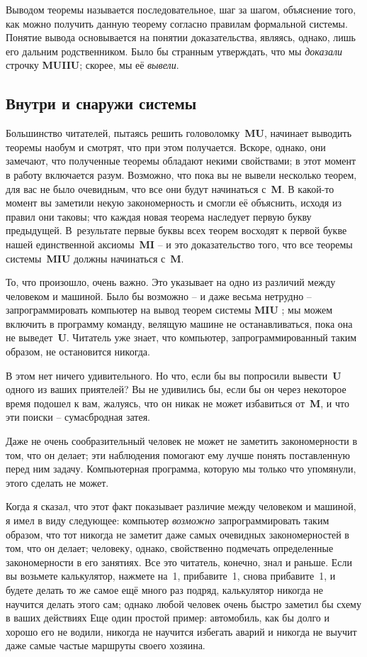 \documentclass[../main.tex]{subfiles}
\begin{document}
Выводом теоремы называется последовательное, шаг за шагом, объяснение того, как можно получить данную теорему согласно правилам формальной системы. Понятие вывода основывается на понятии доказательства, являясь, однако, лишь его дальним родственником. Было бы странным утверждать, что мы \emph{доказали} строчку \textbf{MUIIU}; скорее, мы её \emph{вывели}.


\subsection{Внутри и снаружи системы}

Большинство читателей, пытаясь решить головоломку~\textbf{MU}, начинает выводить теоремы наобум и смотрят, что при этом получается. Вскоре, однако, они замечают, что полученные теоремы обладают некими свойствами; в этот момент в работу включается разум. Возможно, что пока вы не вывели несколько теорем, для вас не было очевидным, что все они будут начинаться с~\textbf{M}. В какой-то момент вы заметили некую закономерность и смогли её объяснить, исходя из правил они таковы; что каждая новая теорема наследует первую букву предыдущей. В~результате первые буквы всех теорем восходят к первой букве нашей единственной аксиомы~\textbf{MI} \--- и это доказательство того, что все теоремы системы~\textbf{MIU} должны начинаться с~\textbf{M}.

То, что произошло, очень важно. Это указывает на одно из различий между человеком и машиной. Было бы возможно \--- и даже весьма нетрудно \--- запрограммировать компьютер на вывод теорем системы \textbf{MIU} ; мы можем включить в программу команду, велящую машине не останавливаться, пока она не выведет~\textbf{U}. Читатель уже знает, что компьютер, запрограммированный таким образом, не остановится никогда.

В этом нет ничего удивительного. Но что, если бы вы попросили вывести~\textbf{U} одного из ваших приятелей? Вы не удивились бы, если бы он через некоторое время подошел к вам, жалуясь, что он никак не может избавиться от~\textbf{M}, и что эти поиски \--- сумасбродная затея.

Даже не очень сообразительный человек не может не заметить закономерности в том, что он делает; эти наблюдения помогают ему лучше понять поставленную перед ним задачу. Компьютерная программа, которую мы только что упомянули, этого сделать не может.

Когда я сказал, что этот факт показывает различие между человеком и машиной, я имел в виду следующее: компьютер \emph{возможно} запрограммировать таким образом, что тот никогда не заметит даже самых очевидных закономерностей в том, что он делает; человеку, однако, свойственно подмечать определенные закономерности в его занятиях. Все это читатель, конечно, знал и раньше. Если вы возьмете калькулятор, нажмете на~1, прибавите~1, снова прибавите~1, и будете делать то же самое ещё много раз подряд, калькулятор никогда не научится делать этого сам; однако любой человек очень быстро заметил бы схему в ваших действиях Еще один простой пример: автомобиль, как бы долго и хорошо его не водили, никогда не научится избегать аварий и никогда не выучит даже самые частые маршруты своего хозяина.
\end{document}
